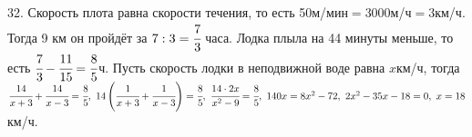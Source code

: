 32. Скорость плота равна скорости течения, то есть 50м/мин$=$3000м/ч$=$3км/ч. Тогда 9 км он пройдёт за $7:3=\cfrac{7}{3}$ часа. Лодка плыла на 44 минуты меньше, то есть $\cfrac{7}{3}-\cfrac{11}{15}=\cfrac{8}{5}$ч. Пусть скорость лодки в неподвижной воде равна $x$км/ч, тогда $\cfrac{14}{x+3}+\cfrac{14}{x-3}=\cfrac{8}{5},\
14\left(\cfrac{1}{x+3}+\cfrac{1}{x-3}\right)=\cfrac{8}{5},\ \cfrac{14\cdot2x}{x^2-9}=\cfrac{8}{5},\ 140x=8x^2-72,\ 2x^2-35x-18=0,\ x=18$км/ч.\\
